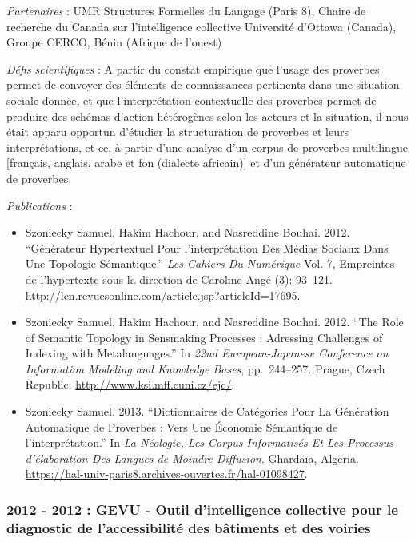 \documentclass[
  a4paper,
  DIV=11,
  numbers=noendperiod]{scrreprt}
\begin{document}
\emph{Partenaires} : UMR Structures Formelles du Langage (Paris 8),
Chaire de recherche du Canada sur l'intelligence collective Université
d'Ottawa (Canada), Groupe CERCO, Bénin (Afrique de l'ouest)

\emph{Défis scientifiques} : A partir du constat empirique que l'usage
des proverbes permet de convoyer des éléments de connaissances
pertinents dans une situation sociale donnée, et que l'interprétation
contextuelle des proverbes permet de produire des schémas d'action
hétérogènes selon les acteurs et la situation, il nous était apparu
opportun d'étudier la structuration de proverbes et leurs
interprétations, et ce, à partir d'une analyse d'un corpus de proverbes
multilingue {[}français, anglais, arabe et fon (dialecte africain){]} et
d'un générateur automatique de proverbes.

\emph{Publications} :

\begin{itemize}
\item
  Szoniecky Samuel, Hakim Hachour, and Nasreddine Bouhai. 2012.
  ``Générateur Hypertextuel Pour l'interprétation Des Médias Sociaux
  Dans Une Topologie Sémantique.'' \emph{Les Cahiers Du Numérique} Vol.
  7, Empreintes de l'hypertexte sous la direction de Caroline Angé (3):
  93--121.
  \url{http://lcn.revuesonline.com/article.jsp?articleId=17695}.
\item
  Szoniecky Samuel, Hakim Hachour, and Nasreddine Bouhai. 2012. ``The
  Role of Semantic Topology in Sensmaking Processes : Adressing
  Challenges of Indexing with Metalanguages.'' In \emph{22nd
  European-Japanese Conference on Information Modeling and Knowledge
  Bases}, pp.~244--257. Prague, Czech Republic.
  \url{http://www.ksi.mff.cuni.cz/ejc/}.
\item
  Szoniecky Samuel. 2013. ``Dictionnaires de Catégories Pour La
  Génération Automatique de Proverbes : Vers Une Économie Sémantique de
  l'interprétation.'' In \emph{La Néologie, Les Corpus Informatisés Et
  Les Processus d'élaboration Des Langues de Moindre Diffusion}.
  Ghardaïa, Algeria.
  \url{https://hal-univ-paris8.archives-ouvertes.fr/hal-01098427}.
\end{itemize}

\subsubsection*{2012 - 2012 : GEVU - Outil d'intelligence collective
pour le diagnostic de l'accessibilité des bâtiments et des
voiries}\label{sec-projetGevu}
\end{document}
